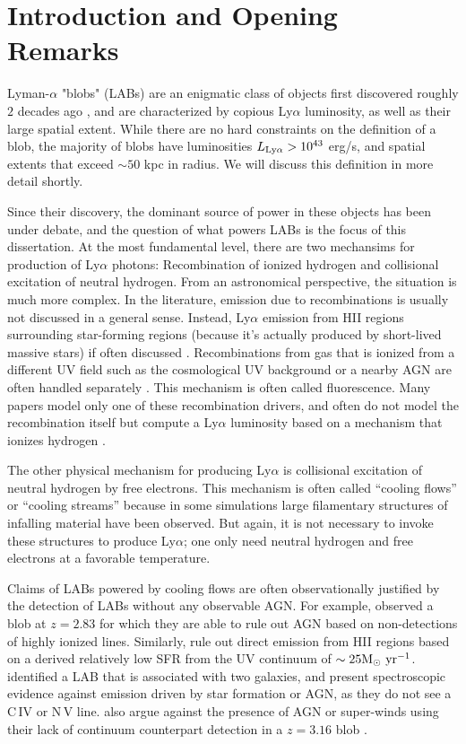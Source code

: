 \chapter{Introduction and Opening Remarks}
\label{sec:intro}

Lyman-$\alpha$ "blobs" (LABs) are an enigmatic class of objects first discovered roughly $2$ decades ago \citep{Fynbo1999,Steidel2000}, and are characterized by copious Ly$\alpha$ luminosity, as well as their large spatial extent.
While there are no hard constraints on the definition of a blob, the majority of blobs have luminosities $L_{\rm{Ly}\alpha} > 10^{43}$ erg/s, and spatial extents that exceed $\sim50$ kpc in radius.
We will discuss this definition in more detail shortly.

Since their discovery, the dominant source of power in these objects has been under debate, and the question of what powers LABs is the focus of this dissertation.
At the most fundamental level, there are two mechansims for production of Ly$\alpha$ photons: Recombination of ionized hydrogen and collisional excitation of neutral hydrogen.
From an astronomical perspective, the situation is much more complex.
In the literature, emission due to recombinations is usually not discussed in a general sense.
Instead, Ly$\alpha$ emission from HII regions surrounding star-forming regions (because it's actually produced by short-lived massive stars) if often discussed \citep[e.g.][]{Geach2016}.
Recombinations from gas that is ionized from a different UV field such as the cosmological UV background or a nearby AGN are often handled separately \citep{Kollmeier2010,Gronke2017}.
This mechanism is often called fluorescence.
Many papers model only one of these recombination drivers, and often do not model the recombination itself but compute a Ly$\alpha$ luminosity based on a mechanism that ionizes hydrogen \citep[e.g.][]{Cen2013}.

The other physical mechanism for producing Ly$\alpha$ is collisional excitation of neutral hydrogen by free electrons.
This mechanism is often called ``cooling flows'' or ``cooling streams'' because in some simulations large filamentary structures of infalling material have been observed.
But again, it is not necessary to invoke these structures to produce Ly$\alpha$; one only need neutral hydrogen and free electrons at a favorable temperature.

Claims of LABs powered by cooling flows are often observationally justified by the detection of LABs without any observable AGN.
For example, \citet{Smith2007} observed a blob at $z=2.83$ for which they are able to rule out AGN based on non-detections of highly ionized lines.
Similarly, \citet{Smith2007} rule out direct emission from HII regions based on a derived relatively low SFR from the UV continuum of  $\sim 25 \rm{M}_{\odot}\ \rm{yr}^{-1}$.
 \citet{Scarlata2009} identified a LAB that is associated with two galaxies, and present spectroscopic evidence against emission driven by star formation or AGN, as they do not see a C\,\textsc{IV} or N\,\textsc{V} line.
\citet{Nilsson2006} also argue against the presence of AGN or super-winds using their lack of continuum counterpart detection in a $z=3.16$ blob \citep[though this is debated, see e.g.][]{Prescott2015}.

